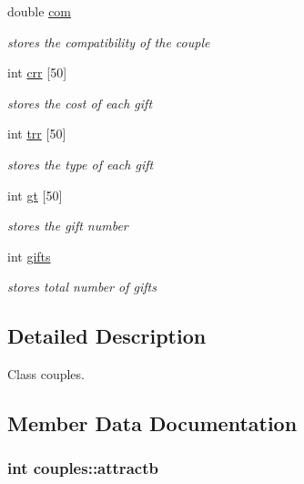 \begin{DoxyCompactItemize}
double \hyperlink{classcouples_a52451c138cfb3ccb76dece86a80478f7}{com}
\begin{DoxyCompactList}\small\item\em stores the compatibility of the couple \end{DoxyCompactList}\item 
int \hyperlink{classcouples_a5519610d90930203210489914957d19e}{crr} \mbox{[}50\mbox{]}
\begin{DoxyCompactList}\small\item\em stores the cost of each gift \end{DoxyCompactList}\item 
int \hyperlink{classcouples_a9096ebfd0783a26242329c9063c5b0f5}{trr} \mbox{[}50\mbox{]}
\begin{DoxyCompactList}\small\item\em stores the type of each gift \end{DoxyCompactList}\item 
int \hyperlink{classcouples_a2a00372f1404d39119a3d3d91c75ef34}{gt} \mbox{[}50\mbox{]}
\begin{DoxyCompactList}\small\item\em stores the gift number \end{DoxyCompactList}\item 
int \hyperlink{classcouples_add4d20dc8238e648baa53e29581dee87}{gifts}
\begin{DoxyCompactList}\small\item\em stores total number of gifts \end{DoxyCompactList}\end{DoxyCompactItemize}


\subsection{Detailed Description}
Class couples. 

\subsection{Member Data Documentation}
\hypertarget{classcouples_aa939bf2c1769e9354a2b0b67c20eaea6}{
\subsubsection[{attractb}]{\setlength{\rightskip}{0pt plus 5cm}int couples\-::attractb}}\label{classcouples_aa939bf2c1769e9354a2b0b67c20eaea6}


